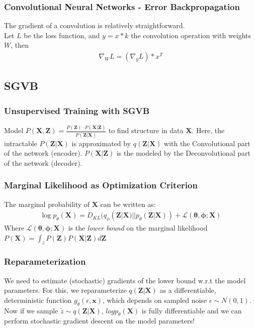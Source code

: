 \documentclass{beamer}
\begin{document}
\begin{frame}
\frametitle{Convolutional Neural Networks - Error Backpropagation}
The gradient of a convolution is relatively straightforward.\\ Let $L$ be the loss function, and $y = x * k$ the convolution operation with weights $W$, then \\   

\begin{align*}
\nabla_W L = (\nabla_y L) * x^T 
\end{align*}

\end{frame}



\subsection{SGVB}
\begin{frame}
\frametitle{Unsupervised Training with SGVB}
Model $P(\mathbf{X},\mathbf{Z}) = \frac{P(\mathbf{Z})\cdot P(\mathbf{X}|\mathbf{Z})}{P(\mathbf{Z}|\mathbf{X})}$ to find structure in data $\mathbf{X}$. \vspace{0.5mm}
Here, the intractable $P(\mathbf{Z}|\mathbf{X})$ is approximated by $q(\mathbf{Z}|\mathbf{X})$ with the Convolutional part of the network (encoder). $P(\mathbf{X}|\mathbf{Z})$ is the modeled by the Deconvolutional part of the network (decoder).
\end{frame}

\begin{frame}
\frametitle{Marginal Likelihood as Optimization Criterion}
The marginal probability of $\mathbf{X}$ can be written as:
\begin{align*}
\log p_\theta(\mathbf{X}) = D_{KL}(q_\phi(\mathbf{Z}|\mathbf{X}) || p_\theta(\mathbf{Z}|\mathbf{X})) + \mathcal{L}(\mathbf{\theta}, \mathbf{\phi}; \mathbf{X})
\end{align*}
Where 
$\mathcal{L}(\mathbf{\theta}, \mathbf{\phi}; \mathbf{X})$
is the \textit{lower bound} on the marginal likelihood
$
P(\mathbf{X}) = \int_z P(\mathbf{Z})P(\mathbf{X}|\mathbf{Z})d\mathbf{Z}$
\end{frame}

\begin{frame}
\frametitle{Reparameterization}
We need to estimate (stochastic) gradients of the lower bound w.r.t the model parameters. For this, we reparameterize $q(\mathbf{Z}|\mathbf{X})$ as a differentiable, deterministic function $g_{\theta}(\epsilon,\mathbf{x})$, which depends on sampled noise $\epsilon \sim N(0,1)$. \\ Now if we sample $\tilde{z} \sim q(\mathbf{Z}|\mathbf{X})$, $logp_{\theta}(\mathbf{X})$ is fully differentiable and we can perform stochastic gradient descent on the model parameters!
\end{frame}
\end{document}
